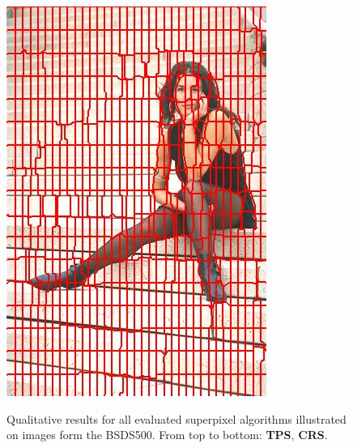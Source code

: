 \begin{figure}
{		\includegraphics[scale=\scalefivebsdtest]{pictures/bsd-test-7-tps}
	}
	\caption[Qualitative results for an additional variant of \textbf{SEEDS} \cite{VanDenBerghBoixRoigCapitaniVanGool:2012} and \textbf{TPS} \cite{DaiTangHuazhaFuXiaochunCao:2012} illustrated on images from the Berkeley Segmentation Dataset \cite{ArbelaezMaireFowlkesMalik:2011}.]{Qualitative results for all evaluated superpixel algorithms illustrated on images form the BSDS500. From top to bottom: \textbf{TPS}, \textbf{CRS}.}
\end{figure}
